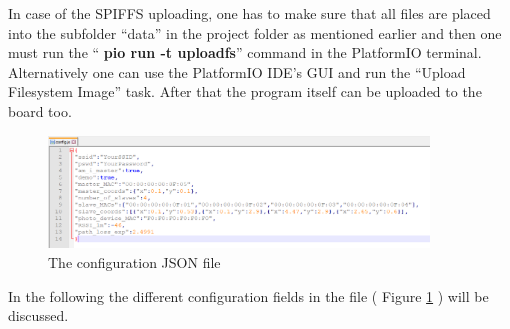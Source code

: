 \documentclass[11pt,a4paper]{article}
\begin{document}
In case of the SPIFFS uploading, one has to make sure that all files are placed into the subfolder ``data'' in the project folder as mentioned earlier and then one must run the ``{\selectfont
\textbf{pio run -t uploadfs}}'' command in the PlatformIO terminal. Alternatively one can use the PlatformIO IDE's GUI and run the ``Upload Filesystem Image'' task. After that the program itself can be uploaded to the board too.

\begin{figure}[H]
    \centering
    \includegraphics[width = 0.9\textwidth]{figures/configFile.PNG}
    \caption{The configuration JSON file}
    \label{fig:config}
\end{figure}

In the following the different configuration fields in the file ( Figure \ref{fig:config} ) will be discussed.
\end{document}

